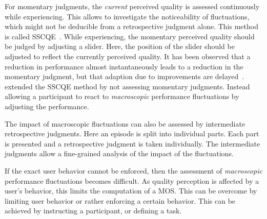 For momentary judgments, the \emph{current} perceived quality is assessed continuously while experiencing.
This allows to investigate the noticeability of fluctuations, which might not be deducible from a retrospective judgment alone.
This method is called \ac{SSCQE}~\citep[][]{itu-r_recommendation_bt.500-13_methodology_2012}.
While experiencing, the momentary perceived quality should be judged by adjusting a slider.
Here, the position of the slider should be adjusted to reflect the currently perceived quality.
It has been observed that a reduction in performance almost instantaneously leads to a reduction in the momentary judgment, but that adaption due to improvements are delayed~\citep[\eg,][]{hands_recency_2001, gros_instantaneous_2001, hamberg_time-varying_1999}.
\citet{borowiak_long_2013} extended the \ac{SSCQE} method by not assessing momentary judgments.
Instead allowing a participant to react to \emph{macroscopic} performance fluctuations by adjusting the performance.

The impact of macroscopic fluctuations can also be assessed by intermediate retrospective judgments.
Here an episode is split into individual parts.
Each part is presented and a retrospective judgment is taken individually.
The intermediate judgments allow a fine-grained analysis of the impact of the fluctuations.

If the exact user behavior cannot be enforced, then the assessment of \emph{macroscopic} performance fluctuations becomes difficult.
As quality perception is affected by a user's behavior, this limits the computation of a \ac{MOS}. %
This can be overcome by limiting user behavior or rather enforcing a certain behavior.
This can be achieved by instructing a participant, or defining a task.

